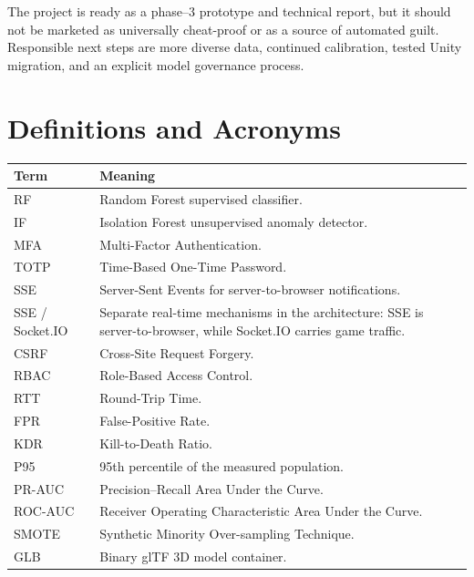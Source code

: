\documentclass[12pt,a4paper,oneside]{report}
\begin{document}
The project is ready as a phase--3 prototype and technical report, but it should not be marketed as universally cheat-proof or as a source of automated guilt. Responsible next steps are more diverse data, continued calibration, tested Unity migration, and an explicit model governance process.

\appendix
\chapter{Definitions and Acronyms}
\begin{longtable}{p{28mm}p{125mm}}
\toprule
Term & Meaning\\
\midrule
RF & Random Forest supervised classifier.\\
IF & Isolation Forest unsupervised anomaly detector.\\
MFA & Multi-Factor Authentication.\\
TOTP & Time-Based One-Time Password.\\
SSE & Server-Sent Events for server-to-browser notifications.\\
SSE / Socket.IO & Separate real-time mechanisms in the architecture: SSE is server-to-browser, while Socket.IO carries game traffic.\\
CSRF & Cross-Site Request Forgery.\\
RBAC & Role-Based Access Control.\\
RTT & Round-Trip Time.\\
FPR & False-Positive Rate.\\
KDR & Kill-to-Death Ratio.\\
P95 & 95th percentile of the measured population.\\
PR-AUC & Precision--Recall Area Under the Curve.\\
ROC-AUC & Receiver Operating Characteristic Area Under the Curve.\\
SMOTE & Synthetic Minority Over-sampling Technique.\\
GLB & Binary glTF 3D model container.\\
\bottomrule
\end{longtable}
\end{document}
